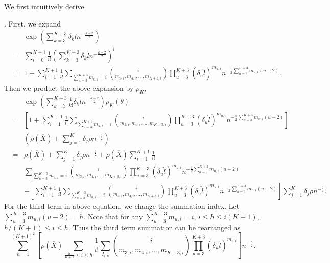 We first intuitively derive %
\begin{comment}
add expansion polynomial
\end{comment}
. First, we expand 
\begin{eqnarray*}
 &  & \exp\left(\sum_{k=3}^{K+3}\delta_{k}\hat{l}n^{-\frac{k-2}{2}}\right)\\
 & = & \sum_{i=0}^{K+1}\frac{1}{i!}\left(\sum_{k=3}^{K+3}\delta_{k}\hat{l}n^{-\frac{k-2}{2}}\right)^{i}\\
 & = & 1+\sum_{i=1}^{K+1}\frac{1}{i!}\sum_{\sum_{u=3}^{K+3}m_{u,i}=i}\binom{i}{m_{3,i},m_{4,i},\ldots,m_{K+3,i}}\prod_{u=3}^{K+3}\left(\delta_{u}\hat{l}\right)^{m_{u,i}}n^{-\frac{1}{2}\sum_{u=3}^{K+3}m_{u,i}\left(u-2\right)}.
\end{eqnarray*}
Then we product the above expansion by $\rho_{K}$, 
\begin{eqnarray*}
 &  & \exp\left(\sum_{k=3}^{K+3}\frac{1}{k!}\delta_{k}\hat{l}n^{-\frac{k-2}{2}}\right)\rho_{K}\left(\theta\right)\\
 & = & \left[1+\sum_{i=1}^{K+1}\frac{1}{i!}\sum_{\sum_{u=3}^{K+3}m_{u,i}=i}\binom{i}{m_{3,i},m_{4,i},\ldots,m_{K+3,i}}\prod_{u=3}^{K+3}\left(\delta_{u}\hat{l}\right)^{m_{u,i}}n^{-\frac{1}{2}\sum_{u=3}^{K+3}m_{u,i}\left(u-2\right)}\right]\\
 &  & \left(\rho\left(\overline{X}\right)+\sum_{j=1}^{K}\delta_{j}\rho n^{-\frac{j}{2}}\right)\\
 & = & \rho\left(\overline{X}\right)+\sum_{j=1}^{K}\delta_{j}\rho n^{-\frac{j}{2}}+\rho\left(\overline{X}\right)\sum_{i=1}^{K+1}\frac{1}{i!}\\
 &  & \sum_{\sum_{u=3}^{K+3}m_{u,i}=i}\binom{i}{m_{3,i},m_{4,i},\ldots,m_{K+3,i}}\prod_{u=3}^{K+3}\left(\delta_{u}\hat{l}\right)^{m_{u,i}}n^{-\frac{1}{2}\sum_{u=3}^{K+3}m_{u,i}\left(u-2\right)}\\
 &  & +\left[\sum_{i=1}^{K+1}\frac{1}{i!}\sum_{\sum_{u=3}^{K+3}m_{u,i}=i}\binom{i}{m_{3,i},m_{4,i},\ldots,m_{K+3,i}}\prod_{u=3}^{K+3}\left(\delta_{u}\hat{l}\right)^{m_{u,i}}n^{-\frac{1}{2}\sum_{u=3}^{K+3}m_{u,i}\left(u-2\right)}\right]\sum_{j=1}^{K}\delta_{j}\rho n^{-\frac{j}{2}}.
\end{eqnarray*}
For the third term in above equation, we change the summation index.
Let $\sum_{u=3}^{K+3}m_{u,i}\left(u-2\right)=h$. Note that for any
$\sum_{u=3}^{K+3}m_{u,i}=i$, $i\le h\le i\left(K+1\right)$, $h/\left(K+1\right)\le i\le h$.
Thus the third term summation can be rearranged as 
\[
\sum_{h=1}^{\left(K+1\right)^{2}}\left[\rho\left(\overline{X}\right)\sum_{\frac{h}{K+1}\le i\le h}\frac{1}{i!}\sum_{I_{i,h}}\binom{i}{m_{3,i},m_{4,i},\ldots,m_{K+3,i}}\prod_{u=3}^{K+3}\left(\delta_{u}\hat{l}\right)^{m_{u,i}}\right]n^{-\frac{h}{2}}.
\]
